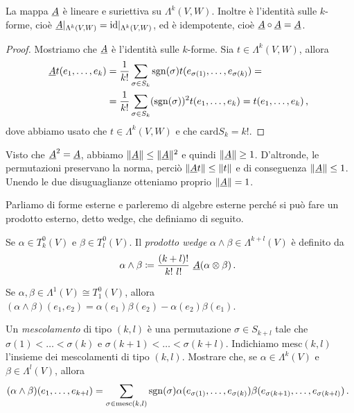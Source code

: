 \begin{proposition}
	La mappa $\antisimm$ è lineare e suriettiva su $\Lambda^k(V,W)$. Inoltre è l'identità sulle $k$-forme, cioè $\antisimm\restrict{\Lambda^k(V,W)} = \id\restrict{\Lambda^k(V,W)}$, ed è idempotente, cioè $\antisimm \circ \antisimm = \antisimm$.
\end{proposition}
\begin{proof}
	Mostriamo che $\antisimm$ è l'identità sulle $k$-forme. Sia $t\in\Lambda^k(V,W)$, allora
	\begin{align*}
		\antisimm t(\seqb{e}{k}{,}) &= \frac 1 {k!} \sum_{\sigma \in S_k} \sgn (\sigma) t(e_{\sigma(1)},\ldots, e_{\sigma(k)}) =\\
		& = \frac 1 {k!} \sum_{\sigma \in S_k} (\sgn (\sigma))^2 t(\seqb{e}{k}{,}) = t (\seqb{e}{k}{,}) \virgola
	\end{align*}
	dove abbiamo usato che $t\in\Lambda^k(V,W)$ e che $\mathrm{card} S_k = k!$.
\end{proof}

\begin{remark}
	Visto che $\antisimm^2=\antisimm$, abbiamo $\norm\antisimm \le \norm\antisimm^2$ e quindi $\norm\antisimm \ge 1 $.
	D'altronde, le permutazioni preservano la norma, perciò $\norm{\antisimm t} \le \norm{t}$ e di conseguenza $\norm \antisimm \le 1$.
	Unendo le due disuguaglianze otteniamo proprio $\norm\antisimm = 1$.
\end{remark}

Parliamo di forme esterne e parleremo di algebre esterne perché si può fare un prodotto esterno, detto wedge, che definiamo di seguito.

\begin{definition} 
	Se $\alpha \in T^0_k(V)$ e $\beta \in T^0_l(V)$. Il \emph{prodotto wedge} $\alpha \wedge \beta \in \Lambda^{k+l}(V)$ è definito da
	\begin{equation*}
		\alpha\wedge \beta \coloneqq \frac {(k+l)!}{k!\ l!}\ \antisimm(\alpha\otimes \beta)\punto
	\end{equation*}
\end{definition}

\begin{example}
	Se $\alpha,\beta\in\Lambda^1(V) \cong T^0_1(V)$, allora $(\alpha\wedge \beta)(e_1,e_2) = \alpha(e_1)\beta(e_2) - \alpha(e_2)\beta(e_1)$.
\end{example}

\begin{exercise} 
	Un \emph{mescolamento} di tipo $(k,l)$ è una permutazione $\sigma \in S_{k+l}$ tale che $\sigma(1) < \ldots < \sigma(k)$ e $\sigma(k+1) <\ldots < \sigma(k+l)$.
	Indichiamo $\mathrm{mesc} (k,l)$ l'insieme dei mescolamenti di tipo $(k,l)$.
	Mostrare che, se $\alpha\in\Lambda^k(V)$ e $\beta\in\Lambda^l(V)$, allora
	\begin{equation*}
	(\alpha\wedge\beta)(\seqb{e}{k+l}{,}) = \sum_{\sigma \in \mathrm{mesc}(k,l)} \sgn(\sigma) \alpha(e_{\sigma(1)},\ldots,e_{\sigma(k)}) \beta(e_{\sigma(k+1)},\ldots,e_{\sigma(k+l)})\punto
	\end{equation*}
\end{exercise}

